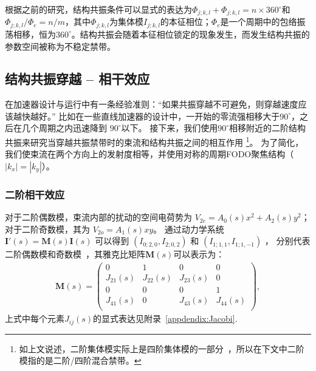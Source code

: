 根据之前的研究\cite{11,li2018structure}，结构共振条件可以显式的表达为$\Phi_{j;k,l}+\Phi_{j;k,l}=n\times 360^{\circ}$和$\Phi_{j;k,l}/\Phi_{e}=n/m$，其中$\Phi_{j;k,l}$为集体模$I_{j;k,l}$的本征相位；$\Phi_{e}$是一个周期中的包络振荡相移，恒为$360^{\circ}$。结构共振会随着本征相位锁定的现象发生，而发生结构共振的参数空间被称为不稳定禁带。

\subsection{结构共振穿越 -- 相干效应}
\label{section:Crossing_Coherent}
在加速器设计与运行中有一条经验准则：“如果共振穿越不可避免，则穿越速度应该越快越好。”
比如在一些直线加速器的设计中，一开始的零流强相移大于$90^{\circ}$，之后在几个周期之内迅速降到 $90^{\circ}$以下。
接下来，我们使用$90^{\circ}$相移附近的二阶结构共振来研究当穿越共振禁带时的束流和结构共振之间的相互作用
\footnote{如上文说述，二阶集体模实际上是四阶集体模的一部分~\cite{li2018structure}，所以在下文中二阶模指的是二阶/四阶混合禁带。}。
为了简化，我们使束流在两个方向上的发射度相等，并使用对称的周期FODO聚焦结构（$|k_x|=|k_y|$）。

\subsubsection{二阶相干效应}
对于二阶偶数模，束流内部的扰动的空间电荷势为  $V_{2e} = A_0(s)x^2 + A_2(s)y^2$；
对于二阶奇数模，其为 $V_{2o}=A_1(s)xy$。
通过动力学系统 $\mathbf{I}'(s)=\mathbf{M}(s)\mathbf{I}(s)$ 可以得到 $({I}_{0;2,0}, I_{2;0,2})$ 和  $(I_{1;1,1}, I_{1;1,-1})$ ，
分别代表二阶偶数模和奇数模~\cite{11, li2018structure, 18}，其雅克比矩阵$\mathbf{M}(s)$可以表示为：
\begin{eqnarray}\label{eq2.5}
\mathbf{M}(s)=
\left(
  \begin{array}{cccc}
    0         & 1         & 0         & 0         \\
    J_{21}(s) & J_{22}(s) & J_{23}(s) & 0         \\
    0         & 0         & 0         & 1         \\
    J_{41}(s) & 0         & J_{43}(s) & J_{44}(s) \\
  \end{array}
\right),
\end{eqnarray}
上式中每个元素$J_{ij}(s)$的显式表达见附录~\eqref{appdendix:Jacobi}.

